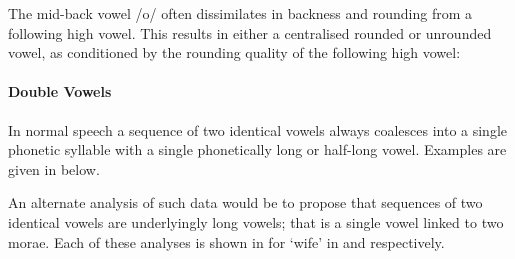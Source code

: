The mid-back vowel /o/ often dissimilates in backness and rounding from a following high vowel.
This results in either a centralised rounded or unrounded vowel,
as conditioned by the rounding quality of the following high vowel:

\begin{exe}
\end{exe}

\paragraph{Double Vowels}\label{sec:DouVow}
In normal speech a sequence of two identical vowels always
coalesces into a single phonetic syllable with a
single phonetically long or half-long vowel.
Examples are given in  below.

\begin{exe}
\end{exe}

An alternate analysis of such data would be to propose that
sequences of two identical vowels are underlyingly long vowels;
that is a single vowel linked to two morae.
Each of these analyses is shown in for  `wife'
in  and  respectively.

